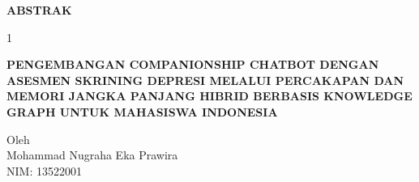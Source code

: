 \begin{center}
{\bfseries\large ABSTRAK}
\end{center}

\vspace{0.5cm}

\begin{spacing}{1}

\begin{center}
{\bfseries PENGEMBANGAN COMPANIONSHIP CHATBOT DENGAN ASESMEN SKRINING DEPRESI MELALUI PERCAKAPAN DAN MEMORI JANGKA PANJANG HIBRID BERBASIS KNOWLEDGE GRAPH UNTUK MAHASISWA INDONESIA}
\end{center}

\vspace{0.3cm}

\begin{center}
Oleh \\
Mohammad Nugraha Eka Prawira \\
NIM: 13522001
\end{center}

\vspace{0.5cm}


\end{spacing}
